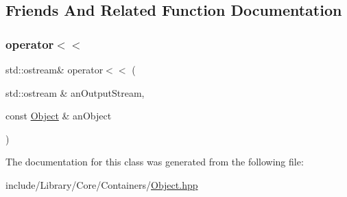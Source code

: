 \subsection{Friends And Related Function Documentation}
\mbox{\label{classlibrary_1_1core_1_1ctnr_1_1_object_a418df9bf4a73078f3d494edef1743f8d}} 
\subsubsection{\texorpdfstring{operator$<$$<$}{operator<<}}
{\footnotesize\ttfamily std\+::ostream\& operator$<$$<$ (\begin{DoxyParamCaption}\item[{std\+::ostream \&}]{an\+Output\+Stream,  }\item[{const \hyperlink{classlibrary_1_1core_1_1ctnr_1_1_object}{Object} \&}]{an\+Object }\end{DoxyParamCaption})\hspace{0.3cm}{\ttfamily [friend]}}



The documentation for this class was generated from the following file\+:\begin{DoxyCompactItemize}
\item 
include/\+Library/\+Core/\+Containers/\hyperlink{_object_8hpp}{Object.\+hpp}\end{DoxyCompactItemize}
